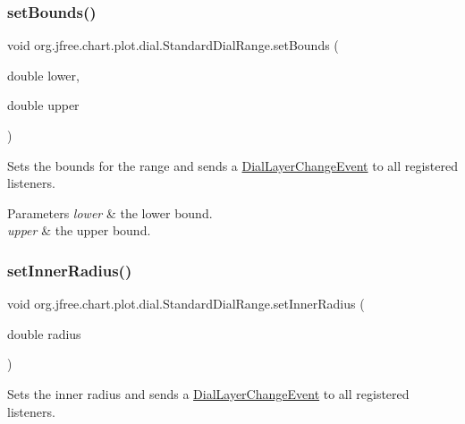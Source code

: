 \subsubsection{\texorpdfstring{set\+Bounds()}{setBounds()}}
{\footnotesize\ttfamily void org.\+jfree.\+chart.\+plot.\+dial.\+Standard\+Dial\+Range.\+set\+Bounds (\begin{DoxyParamCaption}\item[{double}]{lower,  }\item[{double}]{upper }\end{DoxyParamCaption})}

Sets the bounds for the range and sends a \mbox{\hyperlink{classorg_1_1jfree_1_1chart_1_1plot_1_1dial_1_1_dial_layer_change_event}{Dial\+Layer\+Change\+Event}} to all registered listeners.


\begin{DoxyParams}{Parameters}
{\em lower} & the lower bound. \\
\hline
{\em upper} & the upper bound. \\
\hline
\end{DoxyParams}
\mbox{\label{classorg_1_1jfree_1_1chart_1_1plot_1_1dial_1_1_standard_dial_range_a3c79913727054b5ac45caac06f77fdaf}} 
\subsubsection{\texorpdfstring{set\+Inner\+Radius()}{setInnerRadius()}}
{\footnotesize\ttfamily void org.\+jfree.\+chart.\+plot.\+dial.\+Standard\+Dial\+Range.\+set\+Inner\+Radius (\begin{DoxyParamCaption}\item[{double}]{radius }\end{DoxyParamCaption})}

Sets the inner radius and sends a \mbox{\hyperlink{classorg_1_1jfree_1_1chart_1_1plot_1_1dial_1_1_dial_layer_change_event}{Dial\+Layer\+Change\+Event}} to all registered listeners.


